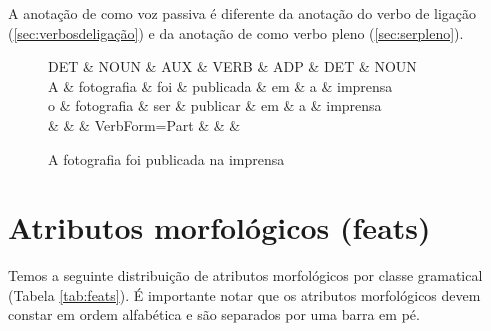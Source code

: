 \documentclass[output=paper,colorlinks,citecolor=brown]{langscibook}
\begin{document}
A anotação de  como voz passiva é diferente da anotação do verbo de ligação (\ref{sec:verbosdeligação}) e da anotação de  como verbo pleno (\ref{sec:serpleno}).

\begin{figure}[htbp]
    \centering
    \vspace{.8cm}
    \begin{dependency}
    \begin{deptext}
    DET \& NOUN \& AUX \& VERB \& ADP \& DET \& NOUN \\
    A \& fotografia \& foi \& publicada \& em \& a \& imprensa \\
    o \& fotografia \& ser \& publicar \& em \& a \& imprensa \\
    \& \& \& VerbForm=Part \& \& \& \\
    \end{deptext}
    \end{dependency}
    \caption{A fotografia foi publicada na imprensa}\label{dep:serPASS}
\end{figure}





\section{Atributos morfológicos (feats)}\label{sec:feats}

Temos a seguinte distribuição de atributos morfológicos por classe gramatical (Tabela \ref{tab:feats}). É importante notar que os atributos morfológicos devem constar em ordem alfabética e são separados por uma barra em pé.
\end{document}
